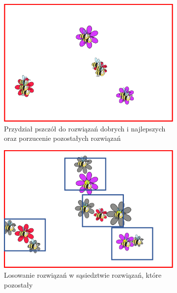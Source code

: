 \begin{figure} [htbp]
\begin{subfigure}[b]{0.32\textwidth}
    \end{subfigure}
    \begin{subfigure}[b]{0.32\textwidth}
    \includegraphics[width=\linewidth]{figures/rojowe/etap4.png}
    \caption{Przydział pszczół do rozwiązań dobrych i najlepszych oraz porzucenie pozostałych rozwiązań}
    \end{subfigure}
    \begin{subfigure}[b]{0.32\textwidth}
    \includegraphics[width=\linewidth]{figures/rojowe/etap5.png}
    \caption{Losowanie rozwiązań w sąsiedztwie rozwiązań, które pozostały}
    \end{subfigure}
    \begin{subfigure}[b]{0.32\textwidth}

\end{subfigure}
\end{figure}
